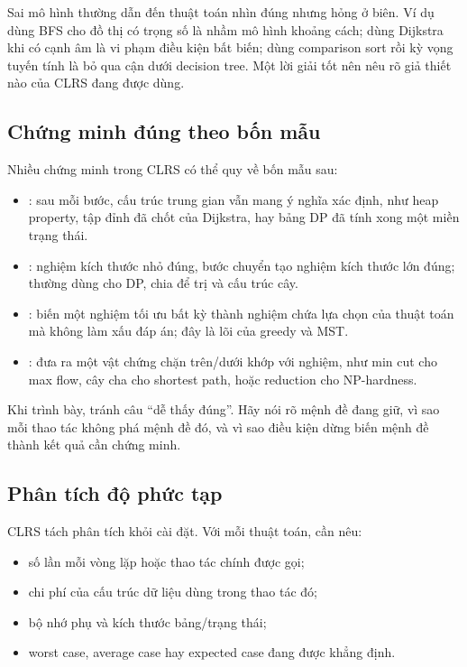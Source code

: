 \documentclass[11pt]{article}
\begin{document}
Sai mô hình thường dẫn đến thuật toán nhìn đúng nhưng hỏng ở biên. Ví dụ dùng
BFS cho đồ thị có trọng số là nhầm mô hình khoảng cách; dùng Dijkstra khi có
cạnh âm là vi phạm điều kiện bất biến; dùng comparison sort rồi kỳ vọng tuyến
tính là bỏ qua cận dưới decision tree. Một lời giải tốt nên nêu rõ giả thiết nào
của CLRS đang được dùng.

\subsection{Chứng minh đúng theo bốn mẫu}

Nhiều chứng minh trong CLRS có thể quy về bốn mẫu sau:
\begin{itemize}
  \item {}: sau mỗi bước, cấu trúc trung gian vẫn mang ý nghĩa xác
        định, như heap property, tập đỉnh đã chốt của Dijkstra, hay bảng DP đã
        tính xong một miền trạng thái.
  \item {}: nghiệm kích thước nhỏ đúng, bước chuyển tạo nghiệm kích
        thước lớn đúng; thường dùng cho DP, chia để trị và cấu trúc cây.
  \item {}: biến một nghiệm tối ưu bất kỳ thành nghiệm chứa lựa
        chọn của thuật toán mà không làm xấu đáp án; đây là lõi của greedy và
        MST.
  \item {}: đưa ra một vật chứng chặn trên/dưới khớp với
        nghiệm, như min cut cho max flow, cây cha cho shortest path, hoặc
        reduction cho NP-hardness.
\end{itemize}

Khi trình bày, tránh câu ``dễ thấy đúng''. Hãy nói rõ mệnh đề đang giữ, vì sao
mỗi thao tác không phá mệnh đề đó, và vì sao điều kiện dừng biến mệnh đề thành
kết quả cần chứng minh.

\subsection{Phân tích độ phức tạp}

CLRS tách phân tích khỏi cài đặt. Với mỗi thuật toán, cần nêu:
\begin{itemize}
  \item số lần mỗi vòng lặp hoặc thao tác chính được gọi;
  \item chi phí của cấu trúc dữ liệu dùng trong thao tác đó;
  \item bộ nhớ phụ và kích thước bảng/trạng thái;
  \item worst case, average case hay expected case đang được khẳng định.
\end{itemize}
\end{document}
